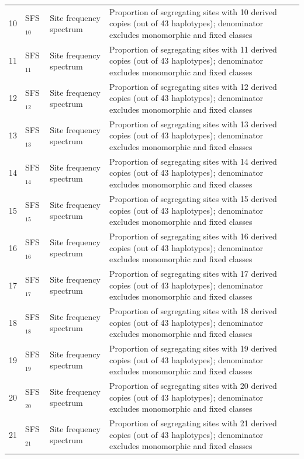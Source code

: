 \begin{longtable}{@{}rllp{7.5cm}@{}}
10 & SFS$_{10}$ & Site frequency spectrum & Proportion of segregating sites with 10 derived copies (out of 43 haplotypes); denominator excludes monomorphic and fixed classes \\
11 & SFS$_{11}$ & Site frequency spectrum & Proportion of segregating sites with 11 derived copies (out of 43 haplotypes); denominator excludes monomorphic and fixed classes \\
12 & SFS$_{12}$ & Site frequency spectrum & Proportion of segregating sites with 12 derived copies (out of 43 haplotypes); denominator excludes monomorphic and fixed classes \\
13 & SFS$_{13}$ & Site frequency spectrum & Proportion of segregating sites with 13 derived copies (out of 43 haplotypes); denominator excludes monomorphic and fixed classes \\
14 & SFS$_{14}$ & Site frequency spectrum & Proportion of segregating sites with 14 derived copies (out of 43 haplotypes); denominator excludes monomorphic and fixed classes \\
15 & SFS$_{15}$ & Site frequency spectrum & Proportion of segregating sites with 15 derived copies (out of 43 haplotypes); denominator excludes monomorphic and fixed classes \\
16 & SFS$_{16}$ & Site frequency spectrum & Proportion of segregating sites with 16 derived copies (out of 43 haplotypes); denominator excludes monomorphic and fixed classes \\
17 & SFS$_{17}$ & Site frequency spectrum & Proportion of segregating sites with 17 derived copies (out of 43 haplotypes); denominator excludes monomorphic and fixed classes \\
18 & SFS$_{18}$ & Site frequency spectrum & Proportion of segregating sites with 18 derived copies (out of 43 haplotypes); denominator excludes monomorphic and fixed classes \\
19 & SFS$_{19}$ & Site frequency spectrum & Proportion of segregating sites with 19 derived copies (out of 43 haplotypes); denominator excludes monomorphic and fixed classes \\
20 & SFS$_{20}$ & Site frequency spectrum & Proportion of segregating sites with 20 derived copies (out of 43 haplotypes); denominator excludes monomorphic and fixed classes \\
21 & SFS$_{21}$ & Site frequency spectrum & Proportion of segregating sites with 21 derived copies (out of 43 haplotypes); denominator excludes monomorphic and fixed classes \\

\end{longtable}
